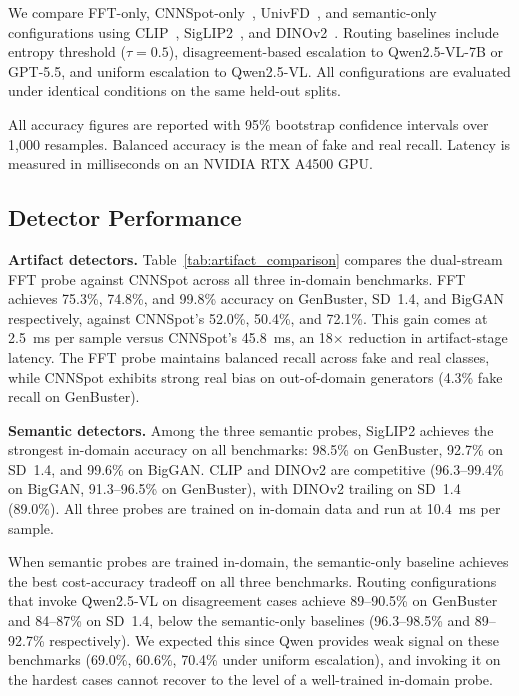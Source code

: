 \documentclass{ieeeaccess}
\begin{document}
We compare FFT-only, CNNSpot-only~\cite{wang2020cnn}, UnivFD~\cite{ojha2023fakedetect},
and semantic-only configurations using CLIP~\cite{pmlr-v139-radford21a},
SigLIP2~\cite{tschannen2025siglip2}, and DINOv2~\cite{oquab2023dinov2}. Routing
baselines include entropy threshold ($\tau = 0.5$), disagreement-based escalation to Qwen2.5-VL-7B or GPT-5.5, and uniform escalation to Qwen2.5-VL. All configurations
are evaluated under identical conditions on the same held-out splits.

All accuracy figures are reported with 95\% bootstrap confidence intervals over 1{,}000
resamples. Balanced accuracy is the mean of fake and real recall. Latency is measured in
milliseconds on an NVIDIA RTX A4500 GPU.

\subsection{Detector Performance}


\textbf{Artifact detectors.} Table~\ref{tab:artifact_comparison} compares the dual-stream
FFT probe against CNNSpot across all three in-domain benchmarks. FFT achieves 75.3\%,
74.8\%, and 99.8\% accuracy on GenBuster, SD~1.4, and BigGAN respectively, against
CNNSpot's 52.0\%, 50.4\%, and 72.1\%. This gain comes at 2.5~ms per sample versus
CNNSpot's 45.8~ms, an 18$\times$ reduction in artifact-stage latency. The FFT probe
maintains balanced recall across fake and real classes, while CNNSpot exhibits strong real
bias on out-of-domain generators (4.3\% fake recall on GenBuster).

\textbf{Semantic detectors.} Among the three semantic probes, SigLIP2 achieves the
strongest in-domain accuracy on all benchmarks: 98.5\% on GenBuster, 92.7\% on SD~1.4,
and 99.6\% on BigGAN. CLIP and DINOv2 are competitive (96.3--99.4\% on BigGAN, 91.3--96.5\% on GenBuster), with DINOv2 trailing on SD~1.4 (89.0\%). 
All three probes are trained on in-domain data and run at 10.4~ms per sample.

When semantic probes are trained in-domain, the semantic-only baseline achieves the best
cost-accuracy tradeoff on all three benchmarks. Routing configurations that invoke
Qwen2.5-VL on disagreement cases achieve 89--90.5\% on GenBuster and 84--87\% on SD~1.4,
below the semantic-only baselines (96.3--98.5\% and 89--92.7\% respectively). We expected this since
Qwen provides weak signal on these benchmarks (69.0\%, 60.6\%, 70.4\% under
uniform escalation), and invoking it on the hardest cases cannot recover to the level of a
well-trained in-domain probe.
\end{document}
